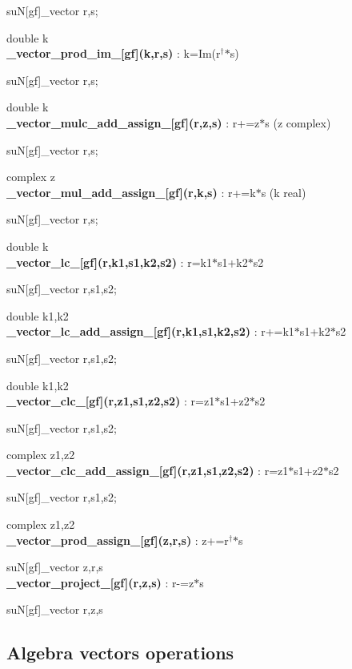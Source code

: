 \documentclass[10pt]{article}
\begin{document}
suN[gf]\_vector r,s; 

double k\\


\noindent\textbf{\_vector\_prod\_im\_[gf](k,r,s) } : k=Im(r$^\dagger$$*$s) 

suN[gf]\_vector r,s; 

double k\\


\noindent\textbf{\_vector\_mulc\_add\_assign\_[gf](r,z,s) } : r+=z$*$s (z complex) 

suN[gf]\_vector r,s; 

complex z\\


\noindent\textbf{\_vector\_mul\_add\_assign\_[gf](r,k,s) } :  r+=k$*$s (k real) 

suN[gf]\_vector r,s;

double k\\


\noindent\textbf{\_vector\_lc\_[gf](r,k1,s1,k2,s2) } : r=k1$*$s1+k2$*$s2 

suN[gf]\_vector r,s1,s2; 

double k1,k2\\


\noindent\textbf{\_vector\_lc\_add\_assign\_[gf](r,k1,s1,k2,s2) } : r+=k1$*$s1+k2$*$s2 

suN[gf]\_vector r,s1,s2; 

double k1,k2\\


\noindent\textbf{\_vector\_clc\_[gf](r,z1,s1,z2,s2) } : r=z1$*$s1+z2$*$s2 

suN[gf]\_vector r,s1,s2; 

complex z1,z2\\


\noindent\textbf{\_vector\_clc\_add\_assign\_[gf](r,z1,s1,z2,s2) } : r=z1$*$s1+z2$*$s2 

suN[gf]\_vector r,s1,s2; 

complex z1,z2\\


\noindent\textbf{\_vector\_prod\_assign\_[gf](z,r,s) } : z+=r$^\dagger$$*$s 

suN[gf]\_vector z,r,s\\


\noindent\textbf{\_vector\_project\_[gf](r,z,s) } : r-=z$*$s 

suN[gf]\_vector r,z,s


\subsection{Algebra vectors operations}
\end{document}
